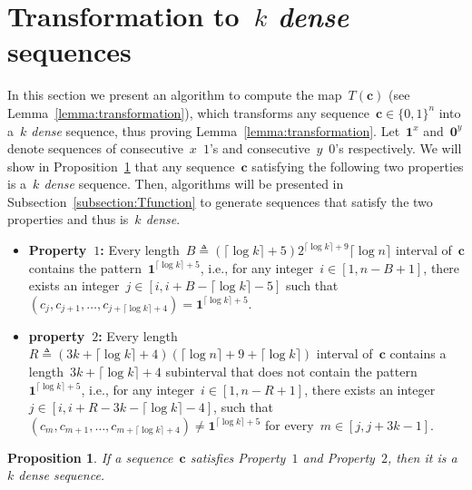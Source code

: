 \documentclass[10pt,a4paper,onecolumn]{IEEEtran}
\newtheorem{proposition}{Proposition}
\newcommand{\1}{\mathbbold{1}}
\newcommand{\boldc}{\mathbf{c}}
\begin{document}
\section{Transformation to~\emph{$k$ dense} sequences}\label{section:transformation}
In this section we present an algorithm to compute the map~$T(\boldc)$ (see Lemma~\ref{lemma:transformation}), which transforms any sequence~$\boldc\in\{0,1\}^n$ into a~\emph{$k$ dense} sequence, thus proving Lemma~\ref{lemma:transformation}. 
Let~$\boldsymbol{1}^{x}$ and~$\boldsymbol{0}^y$ denote sequences of consecutive~$x$~$1$'s and consecutive~$y$~$0$'s respectively. 
We will show in Proposition~\ref{lemma:property1and2} that any sequence~$\boldc$ satisfying the following two properties is a~\emph{$k$ dense} sequence. Then, algorithms will be presented in Subsection~\ref{subsection:Tfunction} to generate sequences that satisfy the two properties and thus 
is~\emph{$k$ dense}. %
\begin{itemize}
    \item[] \textbf{Property~$1$:}
    Every length~$B\triangleq (\lceil \log k\rceil+5)2^{\lceil \log k\rceil+9}\lceil \log n \rceil$ interval of~$\boldc$ contains the pattern~$\boldsymbol{1}^{\lceil \log k\rceil+5}$, i.e., for any integer~$i\in [1,n-B+1]$, there exists an integer~$j\in [i,i+B-\lceil \log k\rceil-5]$ such that~$(c_{j},c_{j+1},\ldots,c_{j+\lceil \log k\rceil+4})= \boldsymbol{1}^{\lceil \log k\rceil+5}$.  
\item[] \textbf{property~$2$:} Every length~$R\triangleq (3k+\lceil \log k\rceil+4)(\lceil \log n\rceil +9+\lceil\log k\rceil)$ interval of~$\boldc$ contains a length~$3k+\lceil \log k\rceil+4$ subinterval that does not contain the pattern~$\boldsymbol{1}^{\lceil \log k\rceil+5}$, i.e.,   
for any integer~$i\in [1,n-R+1]$, there exists an integer~$j\in [i,i+R-3k-\lceil \log k\rceil-4]$, such that~$(c_{m},c_{m+1},\ldots,c_{m+\lceil\log k\rceil+4})\ne \boldsymbol{1}^{\lceil\log k\rceil+5}$ for every~$m\in [j,j+3k-1]$. 

\end{itemize}
\begin{proposition}\label{lemma:property1and2}
If a sequence~$\boldc$ satisfies Property~$1$ and Property~$2$, then it is a~\emph{$k$ dense} sequence.
\end{proposition}
\end{document}
